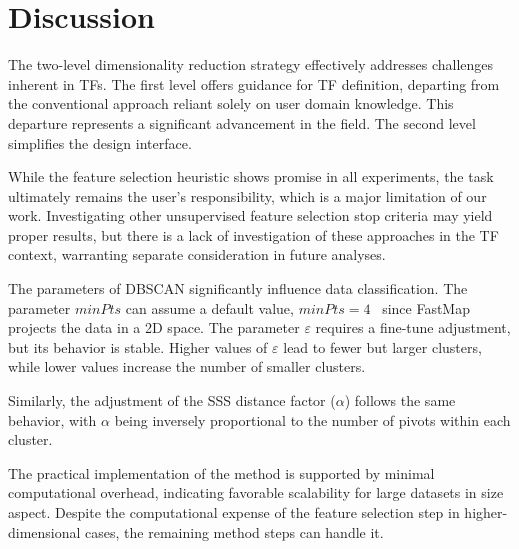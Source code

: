 \section{Discussion}
\label{sect:discussion}

The two-level dimensionality reduction strategy effectively addresses challenges inherent in TFs. The first level offers guidance for TF definition, departing from the conventional approach reliant solely on user domain knowledge. This departure represents a significant advancement in the field. The second level simplifies the design interface.

While the feature selection heuristic shows promise in all experiments, the task ultimately remains the user's responsibility, which is a major limitation of our work. Investigating other unsupervised feature selection stop criteria may yield proper results, but there is a lack of investigation of these approaches in the TF context, warranting separate consideration in future analyses.

The parameters of DBSCAN significantly influence data classification. The parameter $minPts$ can assume a default value, $minPts = 4$~\cite{ester1996} since FastMap projects the data in a 2D space. The parameter 
$\varepsilon$ requires a fine-tune adjustment, but its behavior is stable. Higher values of $\varepsilon$ lead to fewer but larger clusters, while lower values increase the number of smaller clusters. 

Similarly, the adjustment of the SSS distance factor ($\alpha$) follows the same behavior, with $\alpha$ being inversely proportional to the number of pivots within each cluster.


The practical implementation of the method is supported by minimal computational overhead, indicating favorable scalability for large datasets in size aspect. Despite the computational expense of the feature selection step in higher-dimensional cases, the remaining method steps can handle it.